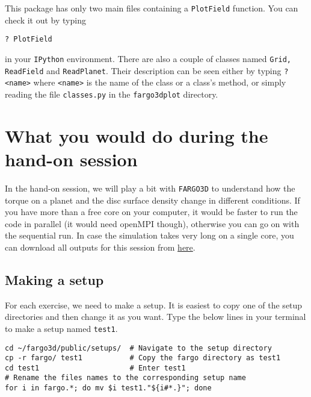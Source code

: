 \documentclass[14pt]{scrartcl}
\begin{document}
This package has only two main files containing a \texttt{PlotField} function. You can check it out by typing 
\begin{verbatim}
? PlotField
\end{verbatim}
in your \texttt{IPython} environment. There are also a couple of classes named \texttt{Grid, ReadField} and \texttt{ReadPlanet}. Their description can be seen either by typing  \texttt{? <name>} where \verb!<name>! is the name of the class or a class's method, or simply reading the file \texttt{classes.py} in the \texttt{fargo3dplot} directory. 


\section{What you would do during the hand-on session} \label{sec:during}
In the hand-on session, we will play a bit with \texttt{FARGO3D} to understand how the torque on a planet and the disc surface density change in different conditions. If you have more than a free core on your computer, it would be faster to run the code in parallel (it would need openMPI though), otherwise you can go on with the sequential run. In case the simulation takes very long on a single core, you can download all outputs for this session from \href{https://fumdrive.um.ac.ir/index.php/s/ac6t3bdYtZZqjTi}{here}. 

\subsection{Making a setup} \label{subsec:setup}
For each exercise, we need to make a setup. It is easiest to copy one of the setup directories and then change it as you want. Type the below lines in your terminal to make a setup named \texttt{test1}.
\begin{verbatim}
cd ~/fargo3d/public/setups/  # Navigate to the setup directory
cp -r fargo/ test1           # Copy the fargo directory as test1
cd test1                     # Enter test1
# Rename the files names to the corresponding setup name
for i in fargo.*; do mv $i test1."${i#*.}"; done  
\end{verbatim}
\end{document}

